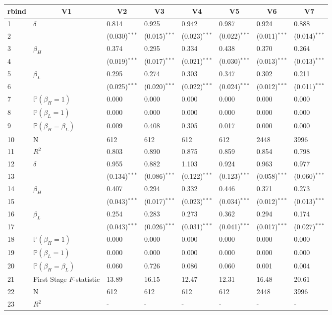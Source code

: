 %
\begin{table}[!tbp]
 \begin{center}
 \begin{tabular*}{\textwidth}{@{\extracolsep{\fill}}llllllll}\hline\hline
\multicolumn{1}{l}{rbind}&\multicolumn{1}{c}{V1}&\multicolumn{1}{c}{V2}&\multicolumn{1}{c}{V3}&\multicolumn{1}{c}{V4}&\multicolumn{1}{c}{V5}&\multicolumn{1}{c}{V6}&\multicolumn{1}{c}{V7}\tabularnewline
\hline
1&$\delta$&0.814&0.925&0.942&0.987&0.924&0.888\tabularnewline
2&&{\scriptsize (0.030)$^{***}$}&{\scriptsize (0.015)$^{***}$}&{\scriptsize (0.023)$^{***}$}&{\scriptsize (0.022)$^{***}$}&{\scriptsize (0.011)$^{***}$}&{\scriptsize (0.014)$^{***}$}\tabularnewline
3&$\beta_H$&0.374&0.295&0.334&0.438&0.370&0.264\tabularnewline
4&&{\scriptsize (0.019)$^{***}$}&{\scriptsize (0.017)$^{***}$}&{\scriptsize (0.021)$^{***}$}&{\scriptsize (0.030)$^{***}$}&{\scriptsize (0.013)$^{***}$}&{\scriptsize (0.013)$^{***}$}\tabularnewline
5&$\beta_L$&0.295&0.274&0.303&0.347&0.302&0.211\tabularnewline
6&&{\scriptsize (0.025)$^{***}$}&{\scriptsize (0.020)$^{***}$}&{\scriptsize (0.022)$^{***}$}&{\scriptsize (0.024)$^{***}$}&{\scriptsize (0.012)$^{***}$}&{\scriptsize (0.011)$^{***}$}\tabularnewline
7&$\mathbb{P}(\beta_H = 1)$&0.000&0.000&0.000&0.000&0.000&0.000\tabularnewline
8&$\mathbb{P}(\beta_L = 1)$&0.000&0.000&0.000&0.000&0.000&0.000\tabularnewline
9&$\mathbb{P}(\beta_H = \beta_L)$&0.009&0.408&0.305&0.017&0.000&0.000\tabularnewline
10&N&612&612&612&612&2448&3996\tabularnewline
11&$R^2$&0.803&0.890&0.875&0.859&0.854&0.798\tabularnewline
12&$\delta$&0.955&0.882&1.103&0.924&0.963&0.977\tabularnewline
13&&{\scriptsize (0.134)$^{***}$}&{\scriptsize (0.086)$^{***}$}&{\scriptsize (0.122)$^{***}$}&{\scriptsize (0.123)$^{***}$}&{\scriptsize (0.058)$^{***}$}&{\scriptsize (0.060)$^{***}$}\tabularnewline
14&$\beta_H$&0.407&0.294&0.332&0.446&0.371&0.273\tabularnewline
15&&{\scriptsize (0.043)$^{***}$}&{\scriptsize (0.017)$^{***}$}&{\scriptsize (0.023)$^{***}$}&{\scriptsize (0.034)$^{***}$}&{\scriptsize (0.012)$^{***}$}&{\scriptsize (0.013)$^{***}$}\tabularnewline
16&$\beta_L$&0.254&0.283&0.273&0.362&0.294&0.174\tabularnewline
17&&{\scriptsize (0.043)$^{***}$}&{\scriptsize (0.026)$^{***}$}&{\scriptsize (0.031)$^{***}$}&{\scriptsize (0.041)$^{***}$}&{\scriptsize (0.017)$^{***}$}&{\scriptsize (0.027)$^{***}$}\tabularnewline
18&$\mathbb{P}(\beta_H = 1)$&0.000&0.000&0.000&0.000&0.000&0.000\tabularnewline
19&$\mathbb{P}(\beta_L = 1)$&0.000&0.000&0.000&0.000&0.000&0.000\tabularnewline
20&$\mathbb{P}(\beta_H = \beta_L)$&0.060&0.726&0.086&0.060&0.001&0.004\tabularnewline
21&First Stage $F$-statistic&13.89&16.15&12.47&12.31&16.48&20.61\tabularnewline
22&N&612&612&612&612&2448&3996\tabularnewline
23&$R^2$&-&-&-&-&-&-\tabularnewline
\hline
\end{tabular*}

\end{center}

\end{table}

